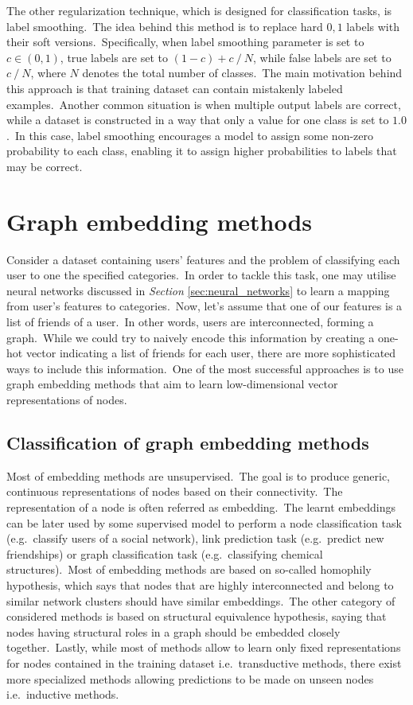 \documentclass[longabstract, english, mgr]{iithesis}
\theoremstyle{default_theorem_style}\newtheorem{theorem}{Theorem}
\theoremstyle{default_theorem_style}\newtheorem{definition}{Definition}
\begin{document}
\noindent The other regularization technique, which is designed for classification tasks, is label
smoothing.\ The idea behind this method is to replace hard $0, 1$ labels with their soft versions.\ Specifically,
when label smoothing parameter is set to $c \in (0, 1)$, true labels are set to $(1 - c) + c\ /\ N$, while false labels
are set to $c\ /\ N$, where $N$ denotes the total number of classes.\ The main motivation behind this approach is that
training dataset can contain mistakenly labeled examples.\ Another common situation is when multiple output labels
are correct, while a dataset is constructed in a way that only a value for one class is set to $1.0$.\ In this case,
label smoothing encourages a model to assign some non-zero probability to each class, enabling it to assign higher
probabilities to labels that may be correct.

\section{Graph embedding methods}\label{sec:graph_embedding_methods}

Consider a dataset containing users' features and the problem of classifying each user to one the specified
categories.\ In order to tackle this task, one may utilise neural networks discussed in
\textit{Section} \ref{sec:neural_networks} to learn a mapping from user's features to categories.\ Now, let's assume
that one of our features is a list of friends of a user.\ In other words, users are interconnected, forming a
graph.\ While we could try to naively encode this information by creating a one-hot vector indicating a list of
friends for each user, there are more sophisticated ways to include this information.\ One of the most successful
approaches is to use graph embedding methods that aim to learn low-dimensional vector representations of nodes.

\subsection{Classification of graph embedding methods}

\noindent Most of embedding methods are unsupervised.\ The goal is to produce generic, continuous representations of
nodes based  on their connectivity.\ The representation of a node is often referred as embedding.\ The learnt
embeddings can be later used by some supervised model to perform a node classification task
(e.g.\ classify users of a social network), link prediction task (e.g.\ predict new friendships) or graph
classification task (e.g.\ classifying chemical structures).\ Most of embedding methods are based on so-called
homophily hypothesis, which says that nodes that are highly interconnected and belong to similar network clusters
should have similar embeddings.\ The other category of considered methods is based on structural equivalence
hypothesis, saying that nodes having structural roles in a graph should be embedded closely together.\ Lastly,
while most of methods allow to learn only fixed representations for nodes contained in the training
dataset i.e.\ transductive methods, there exist more specialized methods allowing predictions to be made on unseen
nodes i.e.\ inductive methods.
\end{document}
